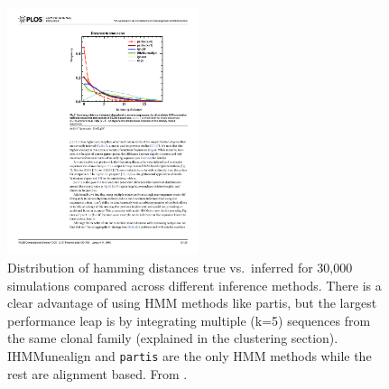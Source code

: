 \begin{figure}
    \centering
    \includegraphics[width=0.5\textwidth]{figures/partis_naiveseq_comparison.pdf}
    \caption{
        \label{fig:partis_naiveseq_comparison}
        Distribution of hamming distances true vs.\ inferred for 30,000 simulations compared across different inference methods.
        There is a clear advantage of using HMM methods like partis, but the largest performance leap is by integrating multiple (k=5) sequences from the same clonal family (explained in the clustering section).
        IHMMunealign and \texttt{partis} are the only HMM methods while the rest are alignment based.
        From \cite{ralph2016consistency}.
    }
\end{figure}


